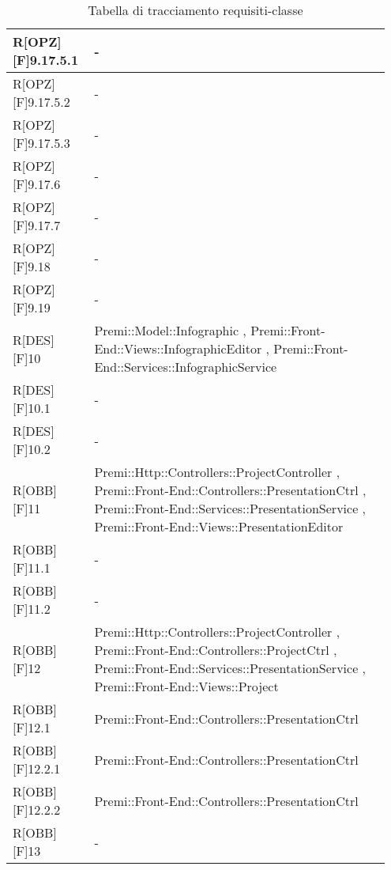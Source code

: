 \begin{table}[h]
	\begin{center}
		\begin{tabular}{|p{0.2\linewidth}|p{0.75\linewidth}|}
			\toprule
			R[OPZ][F]9.17.5.1 & -\\
		\midrule
			R[OPZ][F]9.17.5.2 & -\\
		\midrule
			R[OPZ][F]9.17.5.3 & -\\
		\midrule
			R[OPZ][F]9.17.6 & -\\
		\midrule
			R[OPZ][F]9.17.7 & -\\
		\midrule
			R[OPZ][F]9.18 & -\\
		\midrule
			R[OPZ][F]9.19 & -\\
		\midrule
			R[DES][F]10 & Premi::Model::Infographic , Premi::Front-End::Views::InfographicEditor , Premi::Front-End::Services::InfographicService\\
		\midrule
			R[DES][F]10.1 & -\\
		\midrule
			R[DES][F]10.2 & -\\
		\midrule
			R[OBB][F]11 & Premi::Http::Controllers::ProjectController , Premi::Front-End::Controllers::PresentationCtrl , Premi::Front-End::Services::PresentationService , Premi::Front-End::Views::PresentationEditor\\
		\midrule
			R[OBB][F]11.1 & -\\
		\midrule
			R[OBB][F]11.2 & -\\
		\midrule
			R[OBB][F]12 & Premi::Http::Controllers::ProjectController , Premi::Front-End::Controllers::ProjectCtrl , Premi::Front-End::Services::PresentationService , Premi::Front-End::Views::Project\\
		\midrule
			R[OBB][F]12.1 & Premi::Front-End::Controllers::PresentationCtrl\\
		\midrule
			R[OBB][F]12.2.1 & Premi::Front-End::Controllers::PresentationCtrl\\
		\midrule
			R[OBB][F]12.2.2 & Premi::Front-End::Controllers::PresentationCtrl\\
		\midrule
			R[OBB][F]13 & -\\
			\bottomrule
		\end{tabular}
	\end{center}
	\caption{Tabella di tracciamento requisiti-classe}
\end{table}